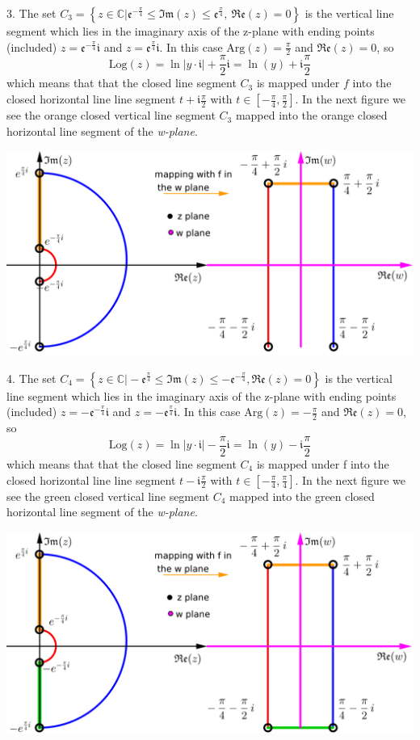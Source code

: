 \documentclass[10.5pt]{amsart}
\newcommand{\dsp}{\displaystyle}
\newcommand{\BBC}{\mathbb{C}}\newcommand{\mi}{\mathfrak{i}}
\begin{document}
3. The set $\dsp C_3=\left\{z\in\BBC\bigg|\mathfrak{e}^{-\frac{\pi}{4}}\leq\mathfrak{Im}(z)\leq\mathfrak{e}^{\frac{\pi}{4}}, \
\mathfrak{Re}(z)=0\right\}$ is the vertical line segment which lies in the imaginary axis of the z-plane with ending points (included)
$\dsp z=\mathfrak{e}^{-\frac{\pi}{4}}\mi$ and $z=\mathfrak{e}^{\frac{\pi}{4}}\mi$. In this case $\dsp\textrm{Arg}(z)=\frac{\pi}{2}$ and 
$\dsp\mathfrak{Re}(z)=0$, so \[\textrm{Log}(z)=\ln|y\cdot \mi|+\frac{\pi}{2}\mi=\ln⁡(y)+\mi\frac{\pi}{2}\] which means that that the 
closed line segment $C_3$ is mapped under $f$ into the closed horizontal line line 
segment $\dsp t+\mi\frac{\pi}{2}$ with 
$t\in\left[-\frac{\pi}{4},\frac{\pi}{2}\right]$. In the next figure we see the orange closed vertical line segment $C_3$ mapped into the 
orange closed horizontal line segment of the \textit{w-plane}.
\begin{center}\includegraphics{2c.png}\end{center}
4.  The set $C_4=\left\{z\in\BBC\bigg|-\mathfrak{e}^{\frac{\pi}{4}}\leq\mathfrak{Im}(z)\leq-\mathfrak{e}^{-\frac{\pi}{4}}, \mathfrak{Re}(z)=0
\right\}$ is the vertical line segment which lies in the imaginary axis of the z-plane with ending points (included) 
$\dsp z=-\mathfrak{e}^{-\frac{\pi}{4}}\mi$ and $\dsp z=-\mathfrak{e}^{\frac{\pi}{4}}\mi$. In this case $\dsp\textrm{Arg}(z)=-\frac{\pi}{2}$ 
and $\dsp\mathfrak{Re}(z)=0$, so \[\textrm{Log}(z)=\ln|y\cdot \mi|−\frac{\pi}{2}\mi=\ln⁡(y)−\mi\frac{\pi}{2}\]
which means that that the closed line segment $C_4$ is mapped under f into the closed horizontal line line segment 
$\dsp t−\mi\frac{\pi}{2}$ with $t\in\left[-\frac{\pi}{4},\frac{\pi}{4}\right]$. In the next figure we see the green closed vertical line 
segment $C_4$ mapped into the green closed horizontal line segment of the \textit{w-plane}.
\begin{center}\includegraphics{2d.png}\end{center}
\end{document}

